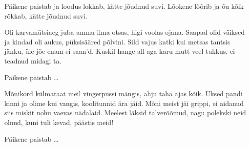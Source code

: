 P\"aikene paistab ja loodus lokkab,
k\"atte j\~oudnud suvi.
L\~ookene l\~o\~orib ja \~ou k\~oik r\~okkab,
k\"atte j\~oudnud suvi.

Oli karvam\"utsiaeg juba ammu ilma otsas,
higi voolas ojana.
Saapad olid v\"aiksed ja kindad oli aukus,
p\"uksis\"a\"ared p\~olvini.
Sild vajus katki kui metsas tantsis j\"anku,
\"ule j\~oe enam ei saan'd.
Kuskil hange all aga karu mutt veel tukkus,
ei teadnud midagi ta.

P\"aikene paistab \ldots

M\~onikord k\"ulmataat meil vingerpussi m\"angis,
ahju taha ajas k\~oik.
Uksed pandi kinni ja olime kui vangis,
koolitunnid \"ara j\"aid.
M\~oni meist j\"ai grippi, ei aidanud siis miskit
nohu vaevas n\"adalaid.
Meelest l\"aksid talver\~o\~omud,
nagu polekski neid olnud,
kuni tuli kevad, p\"a\"astis meid!

P\"aikene paistab \ldots